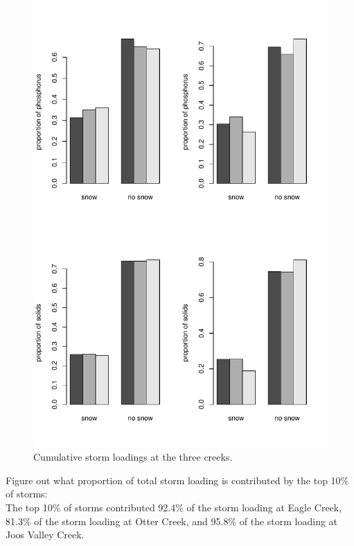 \documentclass[12pt]{article}
\begin{document}
\begin{figure}
    \begin{center}
\includegraphics{loadings-fig3}
    \end{center}
    \caption{Cumulative storm loadings at the three creeks.\label{bars2}}
\end{figure}



Figure out what proportion of total storm loading is contributed by the top 10\% of storms:\\






The top 10\% of storms contributed 92.4\% of the storm loading at Eagle Creek, 81.3\% of the storm loading at Otter Creek, and 95.8\% of the storm loading at Joos Valley Creek.\\
\end{document}
